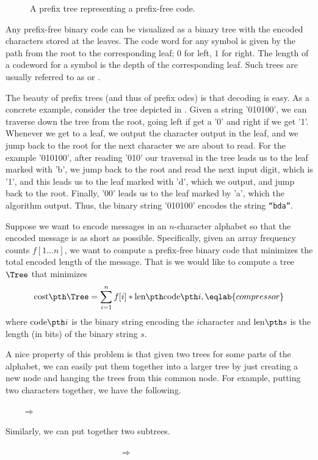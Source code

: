 \begin{figure}[t]
    \centering
    \caption{A prefix tree representing a prefix-free code.}
\end{figure}

Any prefix-free binary code can be visualized as a binary tree with
the encoded characters stored at the leaves. The code word for any
symbol is given by the path from the root to the corresponding leaf;
$0$ for left, $1$ for right. The {length} of a codeword for a symbol
is the depth of the corresponding leaf. Such trees are usually
referred to as  or .



The beauty of prefix trees (and thus of prefix odes) is that decoding
is easy.  As a concrete example, consider the tree depicted in
. Given
a string '010100', we can traverse down the tree from the root, going
left if get a '0' and right if we get '1'. Whenever we get to a leaf,
we output the character output in the leaf, and we jump back to the
root for the next character we are about to read. For the example
'010100', after reading '010' our traversal in the tree leads us to
the leaf marked with 'b', we jump back to the root and read the next
input digit, which is '1', and this leads us to the leaf marked with
'd', which we output, and jump back to the root. Finally, '00' leads
us to the leaf marked by 'a', which the algorithm output. Thus, the
binary string '010100' encodes the string \texttt{``b{}d{}a''}.


Suppose we want to encode messages in an $n$-character alphabet so
that the encoded message is as short as possible. Specifically, given
an array frequency counts $f[1 \ldots n]$, we want to compute a
prefix-free binary code that minimizes the total encoded length of the
message. That is we would like to compute a tree $\Tree$ that
minimizes
\begin{align}
    \costX{\Tree} = 
    \sum_{i=1}^n f[i] * \lengthX{ \codeX{i}}, %
    \eqlab{compressor}
\end{align}
where $\codeX{i}$ is the binary string encoding the $i$\th character
and $\lengthX{s}$ is the length (in bits) of the binary string $s$.


A nice property of this problem is that given two trees for some parts
of the alphabet, we can easily put them together into a larger tree by
just creating a new node and hanging the trees from this common
node. For example, putting two characters together, we have the following.
\begin{center}
      
    ~~~~$\Rightarrow$~~~~
\end{center}
Similarly, we can put together two subtrees.
\begin{center}
    ~~~~~~~~~~~~~~~~~~~~~~
    \TreePKGtriangle[A]{1cm}{1cm}    
    \TreePKGtriangle[B]{1cm}{1cm}    
    ~~~~$\Rightarrow$~~~~
    \tree{\TreePKGtriangle[A]{1cm}{1cm}    }{
    \TreePKGtriangle[B]{1cm}{1cm}    }
\end{center}

